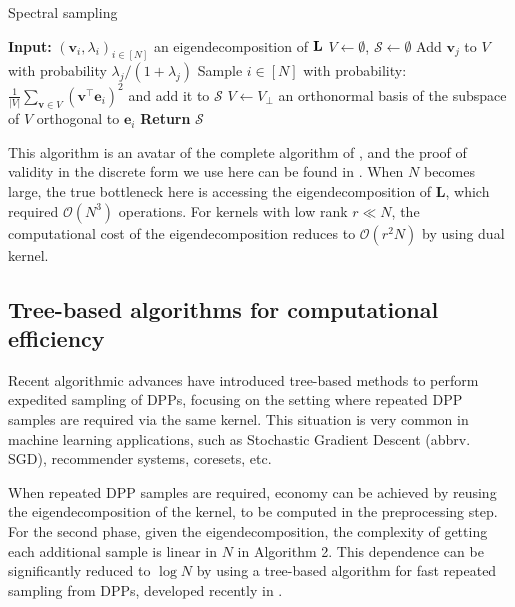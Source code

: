 \begin{algorithm} [H]
\caption{Spectral sampling}
\begin{algorithmic}[1]
    \State \textbf{Input:} $(\mathbf v_i, \lambda_i)_{i \in [N]}$ an eigendecomposition of $\mathbf{L}$
    \State $V \gets \emptyset$, $\mathcal S \gets \emptyset$
        \State Add $\mathbf v_j$ to $V$ with probability $\lambda_j/(1+\lambda_j)$
    \EndFor
        \State Sample $i \in [N]$ with probability: $\frac{1}{\lvert V \rvert} \sum \limits_{\mathbf v \in V} (\mathbf v^\top \mathbf e_i)^2 $ and add it to $\mathcal S$
        \State $V \gets V_\perp$ an orthonormal basis of the subspace of $V$ orthogonal to $\mathbf e_i$
    \EndWhile
    \State \textbf{Return} $\mathcal S$
\end{algorithmic}
\end{algorithm}
This algorithm is an avatar of the complete algorithm of \cite{HKPV}, and the proof of validity in the discrete form we use here can be found in \cite{kulesza_determinantal_2012}.
When $N$ becomes large, the true bottleneck here is accessing the eigendecomposition of $\mathbf{L}$, which required $\mathcal{O}(N^3)$ operations. For kernels with low rank $r \ll N$, the computational cost of the eigendecomposition reduces to $\mathcal{O}(r^2N)$ by using dual kernel. 

\subsection{Tree-based algorithms for computational efficiency}
Recent algorithmic advances have introduced tree-based methods to perform expedited sampling of DPPs, focusing on the setting where repeated DPP samples are required via the same kernel. This situation is very common in machine learning applications, such as Stochastic Gradient Descent (abbrv. SGD), recommender systems, coresets, etc. 

When repeated DPP samples are required, economy can be achieved by reusing the eigendecomposition of the kernel, to be computed in the preprocessing step. For the second phase, given the eigendecomposition, the complexity of getting each additional sample is linear in $N$ in Algorithm 2. This dependence can be significantly reduced to $\log N$ by using a tree-based algorithm for fast repeated sampling from DPPs, developed recently in \cite{kulesza-gillenwater}. 

